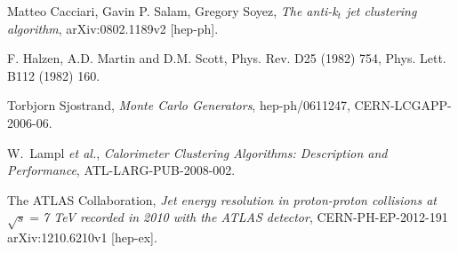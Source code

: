 \documentclass[UKenglish,texlive=2013]{\ATLASLATEXPATH atlasdoc}
\begin{document}
\begin{thebibliography}{9}







Matteo Cacciari, Gavin P. Salam, Gregory Soyez,
\emph{The anti-k$_t$ jet clustering algorithm},
arXiv:0802.1189v2 [hep-ph]. 

F. Halzen, A.D. Martin and D.M. Scott,  
Phys. Rev. D25 (1982) 754,
Phys. Lett. B112 (1982) 160.

Torbjorn Sjostrand,
\emph{Monte Carlo Generators},
hep-ph/0611247,
CERN-LCGAPP-2006-06.

W.~Lampl \emph{et al.},
\emph{Calorimeter Clustering Algorithms: Description and Performance},
ATL-LARG-PUB-2008-002.

The ATLAS Collaboration,
\emph{Jet energy resolution in proton-proton collisions at $\sqrt{s}=$7 TeV recorded in 2010 with the ATLAS detector},
CERN-PH-EP-2012-191
arXiv:1210.6210v1  [hep-ex].


\end{thebibliography}
\end{document}

